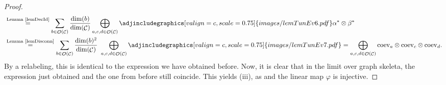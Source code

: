 \documentclass[10pt,a4paper]{amsart}
\DeclareMathOperator{\K}{\mathbb{K}}
\DeclareMathOperator{\calc}{\mathcal{C}}
\DeclareMathOperator{\calo}{\mathcal{O}}
\numberwithin{equation}{section}
\theoremstyle{definition}
\begin{document}
\begin{proof}
\begin{align*}
 &\overset{\text{Lemma~\ref{lemDecId}}}{=} \sum_{b \in \calo(\calc)} \frac{\dim(b)}{\dim(\calc)}\bigoplus_{a,c,d \in \calo(\calc)} \adjincludegraphics[valign=c, scale = 0.75]{images/lemTunEv6.pdf} \alpha^* \otimes \beta^*\\
 &\overset{\text{Lemma~\ref{lemDisconn}}}{=} \sum_{b \in \calo(\calc)} \frac{\dim(b)^2}{\dim(\calc)} \, \, \bigoplus_{a, c, d \in \calo(\calc)} \adjincludegraphics[valign=c, scale = 0.75]{images/lemTunEv7.pdf}= \bigoplus_{a, c, d \in \calo(\calc)} \mathrm{coev}_a \otimes \mathrm{coev}_c \otimes \mathrm{coev}_d.
 \end{align*}
 By a relabeling, this is identical to the expression we have obtained before. Now, it is clear that in the limit over graph skeleta, the expression just obtained and the one from before still coincide. This yields (iii), as \smash{$\varphi([x]) = \tau_x = |\overline{\mathbb{T}_x^s} |_{\mathcal{C}}(1_{\K})$} and the linear map $\varphi$ is injective.


\end{proof}
\end{document}
